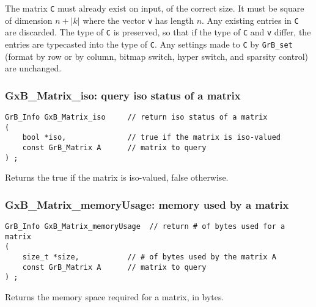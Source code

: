 \documentclass[12pt]{article}
\begin{document}
The matrix \verb'C' must already exist on input, of the correct size.  It must
be square of dimension $n+|k|$ where the vector \verb'v' has length $n$.  Any
existing entries in \verb'C' are discarded.  The type of \verb'C' is preserved,
so that if the type of \verb'C' and \verb'v' differ, the entries are typecasted
into the type of \verb'C'.  Any settings made to \verb'C' by
\verb'GrB_set' (format by row or by column, bitmap switch, hyper
switch, and sparsity control) are unchanged.

\subsubsection{{\sf GxB\_Matrix\_iso:} query iso status of a matrix}
\label{matrix_iso}

\begin{mdframed}[userdefinedwidth=6in]
{\footnotesize
\begin{verbatim}
GrB_Info GxB_Matrix_iso     // return iso status of a matrix
(
    bool *iso,              // true if the matrix is iso-valued
    const GrB_Matrix A      // matrix to query
) ;
\end{verbatim} } \end{mdframed}

Returns the true if the matrix is iso-valued, false otherwise.

\newpage
\subsubsection{{\sf GxB\_Matrix\_memoryUsage:} memory used by a matrix}
\label{matrix_memusage}

\begin{mdframed}[userdefinedwidth=6in]
{\footnotesize
\begin{verbatim}
GrB_Info GxB_Matrix_memoryUsage  // return # of bytes used for a matrix
(
    size_t *size,           // # of bytes used by the matrix A
    const GrB_Matrix A      // matrix to query
) ;
\end{verbatim} } \end{mdframed}

Returns the memory space required for a matrix, in bytes.
\end{document}
